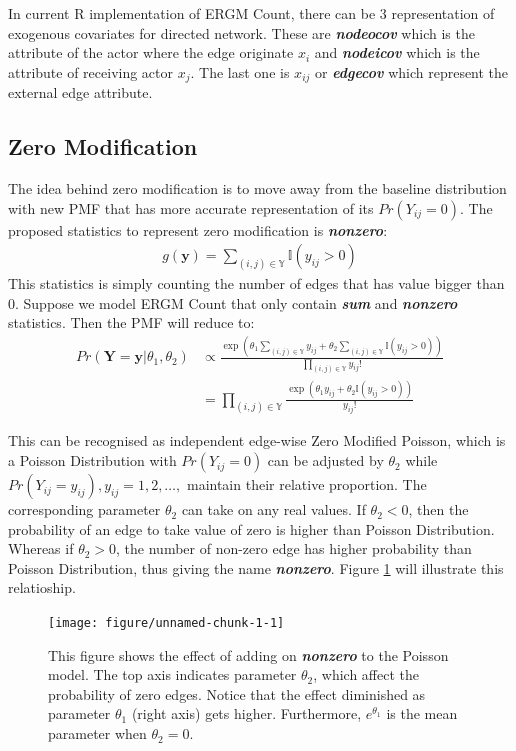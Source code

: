 \documentclass[12pt,a4paper,twoside,openany]{book}
\newenvironment{knitrout}{}{} %
\newcommand{\BI}[1]{\textit{\textbf{#1}}}
\begin{document}
In current R implementation of ERGM Count, there can be 3 representation of exogenous covariates for directed network. 
These are \BI{nodeocov} which is the attribute of the actor where the edge originate $x_{i}$ and \BI{nodeicov} which is the attribute of receiving actor $x_j$. 
The last one is $x_{ij}$ or \BI{edgecov} which represent the external edge attribute.

\subsection{Zero Modification}
The idea behind zero modification is to move away from the baseline distribution with new PMF that has more accurate representation of its $Pr(Y_{ij}=0)$. 
The proposed statistics to represent zero modification is \BI{nonzero}:
\begin{align}
g(\bm{y}) = \sum_{(i,j) \in \mathbb{Y}} \mathbb{I}(y_{ij} > 0)
\end{align}
This statistics is simply counting the number of edges that has value bigger than 0. 
Suppose we model ERGM Count that only contain \BI{sum} and \BI{nonzero} statistics. 
Then the PMF will reduce to:
\begin{align*}
Pr(\bm{Y}=\bm{y}|\theta_1,\theta_2) &\propto \frac{\exp\left(\theta_1 \sum_{(i,j) \in \mathbb{Y}} y_{ij} + \theta_2 \sum_{(i,j) \in \mathbb{Y}} \mathbb{I}(y_{ij} > 0)\right)}{\prod_{(i,j) \in \mathbb{Y}}y_{ij}!}\\
&=\prod_{(i,j) \in \mathbb{Y}} \frac{\exp \left(\theta_1 y_{ij} + \theta_2 \mathbb{I}(y_{ij} > 0)\right)}{y_{ij}!}
\end{align*}

This can be recognised as independent edge-wise Zero Modified Poisson, which is a Poisson Distribution with $Pr(Y_{ij}=0)$ can be adjusted by $\theta_2$ while $Pr(Y_{ij}=y_{ij}), y_{ij}=1,2,\ldots,$ maintain their relative proportion.
The corresponding parameter $\theta_2$ can take on any real values. 
If $\theta_2 <0$, then the probability of an edge to take value of zero is higher than Poisson Distribution. 
Whereas if $\theta_2>0$, the number of non-zero edge has higher probability than Poisson Distribution, thus giving the name \textit{\textbf{nonzero}}. Figure \ref{fig: Zero Modified Poisson} will illustrate this relatioship.

\begin{figure}[H]
\begin{knitrout}
\color{fgcolor}

{\centering \texttt{[image: figure/unnamed-chunk-1-1]} 

}



\end{knitrout}
\caption ["Illustration of Zero-Modified Poisson"]{This figure shows the effect of adding on \textit{\textbf{nonzero}} to the Poisson model. The top axis indicates parameter $\theta_2$, which affect the probability of zero edges. Notice that the effect diminished as parameter $\theta_1$ (right axis) gets higher. Furthermore, $e^{\theta_1}$ is the mean parameter when $\theta_2=0$.}
\label{fig: Zero Modified Poisson}
\end{figure}
\end{document}
